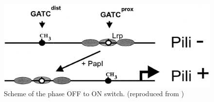 \begin{figure}[h!]
  \centering
  \includegraphics[scale=0.3]{text/Pictures/papPili.png}
	\caption{Scheme of the  phase OFF to ON switch. (reproduced from \cite{low2001roles})}
	\label{pap}
\end{figure}



